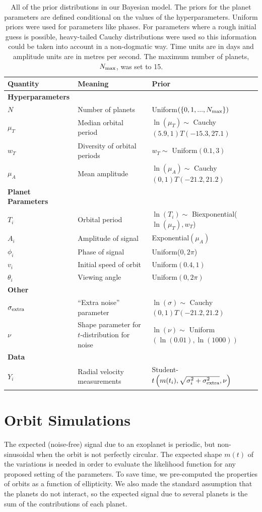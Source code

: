 \documentclass[useAMS,usenatbib]{mn2e}
\begin{document}
\begin{table}
\begin{tabular}{|l|l|l|}
\hline
Quantity	&	Meaning		& Prior\\
\hline
{\bf Hyperparameters}	&	\\
$N$		& Number of planets	& Uniform$(\{0, 1, ..., N_{\rm max}\})$\\
$\mu_T$		&	Median orbital period	& $\ln(\mu_T) \sim$ Cauchy$(5.9, 1)T(-15.3, 27.1)$\\
$w_T$		&	Diversity of orbital periods & $w_T \sim$ Uniform$(0.1, 3)$\\
$\mu_A$		&	Mean amplitude	& $\ln(\mu_A) \sim$ Cauchy$(0, 1)T(-21.2, 21.2)$\\
\hline
{\bf Planet Parameters}\\
$T_i$		&	Orbital period	&	$\ln(T_i) \sim $ Biexponential($\ln(\mu_T), w_T$)\\
$A_i$		&	Amplitude of signal	& Exponential$(\mu_A)$\\
$\phi_i$	&	Phase of signal	&	Uniform($0, 2\pi$)\\
$v_i$		&	Initial speed of orbit	&	Uniform$(0.4, 1)$\\
$\theta_i$	&	Viewing angle	&	Uniform$(0, 2\pi)$\\
\hline
{\bf Other}\\
$\sigma_{\rm extra}$	& ``Extra noise'' parameter	& $\ln(\sigma) \sim$ Cauchy$(0, 1)T(-21.2, 21.2)$\\
$\nu$		& Shape parameter for $t$-distribution for noise & $\ln(\nu) \sim$ Uniform$(\ln(0.01), \ln(1000))$\\
\hline
{\bf Data}\\
$Y_i$		& Radial velocity measurements	&
		Student-$t\left(m(t_i), \sqrt{\sigma_i^2 + \sigma_{\rm extra}^2}, \nu\right)$
\end{tabular}
\caption{All of the prior distributions in our Bayesian model.
The priors for the planet parameters are defined conditional on the values
of the hyperparameters. Uniform priors were used for parameters like phases.
For parameters where a rough initial guess is possible, heavy-tailed Cauchy
distributions were used so this information could be taken into account
in a non-dogmatic way. Time units are in days and amplitude units are
in metres per second. The maximum number of planets, $N_{\rm max}$, was
set to 15.\label{tab:priors}}
\end{table}

\section{Orbit Simulations}\label{sec:orbits}
The expected (noise-free) signal due to an exoplanet is periodic, but
non-sinusoidal when the orbit is not perfectly circular. The expected
shape $m(t)$ of the variations is needed in order to evaluate the likelihood
function for any proposed setting of the parameters.
To save time, we pre-computed the properties of orbits as a function of
ellipticity. We also made the standard assumption that the planets do not
interact, so the expected signal due to several planets is the sum of the
contributions of each planet.
\end{document}

